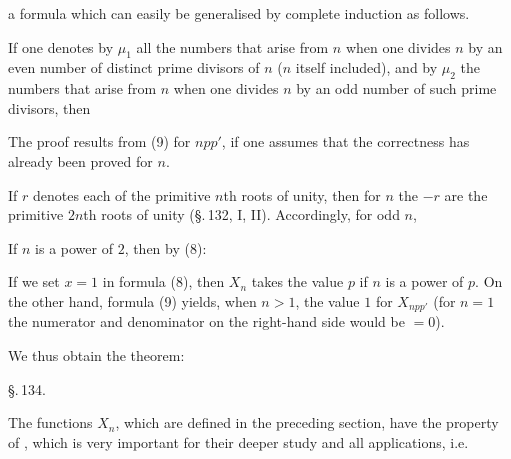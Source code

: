 a formula which can easily be generalised by complete induction as follows.

If one denotes by $\mu_1$ all the numbers that arise from $n$ when one divides
$n$ by an even number of distinct prime divisors of $n$ ($n$ itself included),
and by $\mu_2$ the numbers that arise from $n$ when one divides $n$ by an odd
number of such prime divisors, then


The proof results from (9) for $npp'$, if one assumes that the correctness has
already been proved for $n$.

If $r$ denotes each of the primitive $n$th roots of unity, then for  $n$
the $-r$ are the primitive $2n$th roots of unity (\S.\,132, I, II).
Accordingly, for odd $n$,


If $n$ is a power of $2$, then by (8):


If we set $x = 1$ in formula (8), then $X_n$ takes the value $p$ if $n$ is a
power of $p$. On the other hand, formula (9) yields, when $n > 1$, the value
$1$ for $X_{npp'}$ (for $n = 1$ the numerator and denominator on the
right-hand side would be $= 0$).

We thus obtain the theorem:


\begin{center}
\S.\,134.

\end{center}

The functions $X_n$, which are defined in the preceding section, have the
property of , which is very important for their
deeper study and all applications, i.e.

